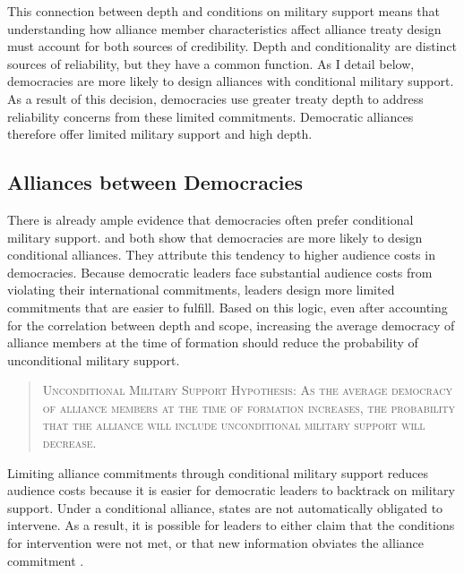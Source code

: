 \documentclass[12pt]{article}
\begin{document}
This connection between depth and conditions on military support means that understanding how alliance member characteristics affect alliance treaty design must account for both sources of credibility.  
Depth and conditionality are distinct sources of reliability, but they have a common function. 
As I detail below, democracies are more likely to design alliances with conditional military support. 
As a result of this decision, democracies use greater treaty depth to address reliability concerns from these limited commitments.  
Democratic alliances therefore offer limited military support and high depth. 


\subsection{Alliances between Democracies}


There is already ample evidence that democracies often prefer conditional military support. 
\citet{Mattes2012} and \citet{Chibaetal2015} both show that democracies are more likely to design conditional alliances. 
They attribute this tendency to higher audience costs in democracies. 
Because democratic leaders face substantial audience costs from violating their international commitments, leaders design more limited commitments that are easier to fulfill. 
Based on this logic, even after accounting for the correlation between depth and scope, increasing the average democracy of alliance members at the time of formation should reduce the probability of unconditional military support.


\begin{quote}
\textsc{Unconditional Military Support Hypothesis: As the average democracy of alliance members at the time of formation increases, the probability that the alliance will include unconditional military support will decrease.}
\end{quote} 


Limiting alliance commitments through conditional military support reduces audience costs because it is easier for democratic leaders to backtrack on military support. 
Under a conditional alliance, states are not automatically obligated to intervene. 
As a result, it is possible for leaders to either claim that the conditions for intervention were not met, or that new information obviates the alliance commitment \citep{LevenduskyHorowitz2012}. 
\end{document}
